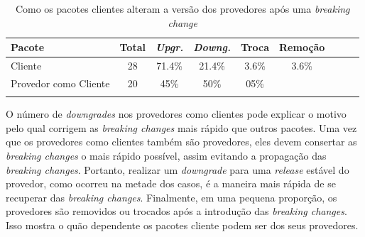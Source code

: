 \vspace{0.4cm}
\begin{table}
	\centering
	\caption{Como os pacotes clientes alteram a versão dos provedores após uma \textit{breaking change}}
	\begin{tabular}{lcccccccc} \toprule
		\textbf{Pacote} & \textbf{Total} & \textbf{\textit{Upgr.}} & \textbf{\textit{Downg.}} & \textbf{Troca} & \textbf{Remoção} \\ \midrule
		Cliente               & 28 & 71.4\% & 21.4\% & 3.6\%  & 3.6\%  \\
		Provedor como Cliente & 20 & 45\%   & 50\%   & 05\%   & \textemdash \\ \bottomrule
		\label{tab:version_change}
	\end{tabular}
\end{table}

O número de \textit{downgrades} nos provedores como clientes pode explicar o motivo pelo qual corrigem as \textit{breaking changes} mais rápido que outros pacotes. Uma vez que os provedores como clientes também são provedores, eles devem consertar as \textit{breaking changes} o mais rápido possível, assim evitando a propagação das \textit{breaking changes}. Portanto, realizar um \textit{downgrade} para uma \textit{release} estável do provedor, como ocorreu na metade dos casos, é a maneira mais rápida de se recuperar das \textit{breaking changes}. Finalmente, em uma pequena proporção, os provedores são removidos ou trocados após a introdução das \textit{breaking changes}. Isso mostra o quão dependente os pacotes cliente podem ser dos seus provedores.

